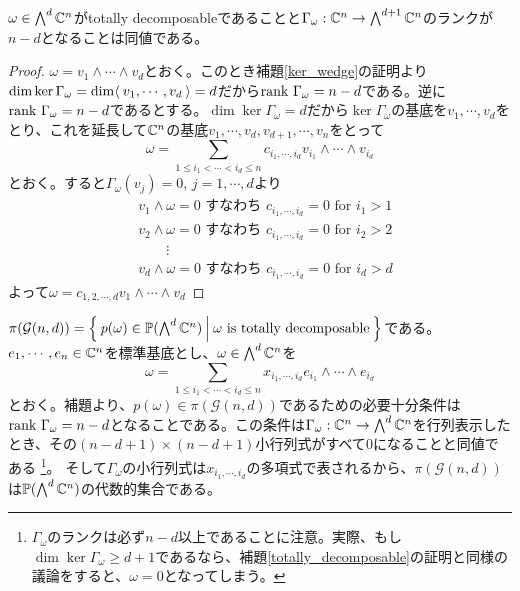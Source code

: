 \documentclass{ltjsreport}
\begin{document}
\begin{lemm}\label{totally_decomposable}
  $\omega\in\bigwedge^d \mathbb{C}^n$がtotally decomposableであることと$\Gamma_\omega:\mathbb{C}^n\rightarrow\bigwedge^{d+1}\mathbb{C}^n$のランクが$n-d$となることは同値である。
\end{lemm}

\begin{proof}
  $\omega=v_1\wedge\cdots\wedge v_d$とおく。このとき補題\ref{ker_wedge}の証明より$\dim\ker\Gamma_\omega=\dim \langle\:v_1,\cdots,v_d\:\rangle=d$だから$\text{rank }\Gamma_\omega=n-d$である。逆に$\text{rank }\Gamma_\omega=n-d$であるとする。$\dim\ker\Gamma_\omega=d$だから$\ker\Gamma_\omega$の基底を$v_1,\cdots,v_d$をとり、これを延長して$\mathbb{C}^n$の基底$v_1,\cdots,v_d,v_{d+1},\cdots,v_n$をとって
  \[
  \omega=\sum_{1\leq i_1<\cdots<i_d\leq n}c_{i_1,\cdots,i_d}v_{i_1}\wedge\cdots\wedge v_{i_d}  
  \]
  とおく。すると$\Gamma_\omega(v_j)=0$, $j=1,\cdots,d$より
  \begin{align*}
    &v_1\wedge\omega=0\text{ すなわち } c_{i_1,\cdots,i_d}=0\text{ for } i_1 > 1\\
    &v_2\wedge\omega=0\text{ すなわち } c_{i_1,\cdots,i_d}=0\text{ for }i_2 > 2\\
    &\qquad\vdots\\
    &v_d\wedge\omega=0\text{ すなわち } c_{i_1,\cdots,i_d}=0\text{ for }i_d > d
  \end{align*}
  よって$\omega=c_{1,2,\cdots,d}v_1\wedge\cdots\wedge v_d$
\end{proof}



$\pi(\mathcal{G}(n,d))=\left\{\:p(\omega)\in\mathbb{P}(\bigwedge^d\mathbb{C}^n)\:\middle|\:\omega\text{ is totally decomposable}\:\right\}$である。$e_1,\cdots,e_n\in \mathbb{C}^n$を標準基底とし、$\omega\in\bigwedge^d\mathbb{C}^n$を
\[
\omega=\sum_{1\leq i_1<\cdots<i_d\leq n}x_{i_1,\cdots,i_d}e_{i_1}\wedge\cdots\wedge e_{i_d}  
\]
とおく。補題より、$p(\omega)\in\pi(\mathcal{G}(n,d))$であるための必要十分条件は$\text{rank }\Gamma_\omega=n-d$となることである。この条件は$\Gamma_\omega:\mathbb{C}^n\rightarrow \bigwedge^d\mathbb{C}^n$を行列表示したとき、その$(n-d+1)\times(n-d+1)$小行列式がすべて$0$になることと同値である
\footnote{
  $\Gamma_\omega$のランクは必ず$n-d$以上であることに注意。実際、もし$\dim\ker\Gamma_{\omega}\geq d+1$であるなら、補題\ref{totally_decomposable}の証明と同様の議論をすると、$\omega=0$となってしまう。
}。
そして$\Gamma_\omega$の小行列式は$x_{i_1,\cdots,i_d}$の多項式で表されるから、$\pi(\mathcal{G}(n,d))$は$\mathbb{P}({\bigwedge^d\mathbb{C}^n})$の代数的集合である。
\end{document}
